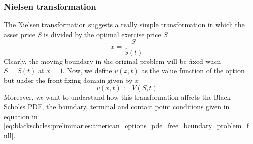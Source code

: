 \subsubsection{Nielsen transformation} \label{sec:blackscholes:frontfixingmethod:nielsen}
The Nielsen transformation suggests a really simple transformation in which
the asset price $S$ is divided by the optimal exercise price $\bar{S}$
\begin{equation}
  x = \dfrac{S}{\bar{S}(t)}
  \label{eq:blackscholes:frontfixingmethod:nielsen}
\end{equation}
Clearly, the moving boundary in the original problem will be fixed when $S=\bar{S}(t)$ at $x=1$. Now, we define $v(x,t)$ as the value function of the option but under the front fixing domain given by $x$
\begin{equation}
  v(x, t) := V(S, t)
  \label{eq:blackscholes:frontfixingmethod:nielsen:value_function}
\end{equation}
Moreover, we want to understand how this transformation affects the Black-Scholes PDE, the boundary, terminal and contact point conditions given in equation in \eqref{eq:blackscholes:preliminaries:american_options_pde_free_boundary_problem_full}.

